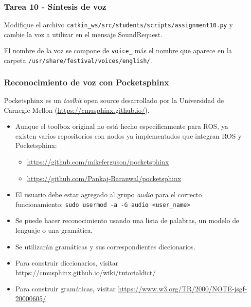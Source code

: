 \begin{frame}[containsverbatim]\frametitle{Tarea 10 - Síntesis de voz}
  Modifique el archivo \texttt{catkin\_ws/src/students/scripts/assignment10.py} y cambie la voz a utilizar en el mensaje SoundRequest.
  
  El nombre de la voz se compone de \texttt{voice\_} más el nombre que aparece en la carpeta \texttt{/usr/share/festival/voices/english/}. 
\end{frame}

\begin{frame}\frametitle{Reconocimiento de voz con Pocketsphinx}
  Pocketsphinx es un \textit{toolkit} open source desarrollado por la Universidad de Carnegie Mellon (\url{https://cmusphinx.github.io/}).
  \begin{itemize}
  \item Aunque el toolbox original no está hecho específicamente para ROS, ya existen varios repositorios con nodos ya implementados que integran ROS y Pocketsphinx:
    \begin{itemize}
    \item \url{https://github.com/mikeferguson/pocketsphinx}
    \item \url{https://github.com/Pankaj-Baranwal/pocketsphinx}
    \end{itemize}
  \item El usuario debe estar agregado al grupo \textit{audio} para el correcto funcionamiento: \texttt{sudo usermod -a -G audio <user\_name>}
  \end{itemize}
  \begin{itemize}
  \item Se puede hacer reconocimiento usando una lista de palabras, un modelo de lenguaje o una gramática.
  \item Se utilizarán gramáticas y sus correspondientes diccionarios.
  \item Para construir diccionarios, visitar \url{https://cmusphinx.github.io/wiki/tutorialdict/}
  \item Para construir gramáticas, visitar \url{https://www.w3.org/TR/2000/NOTE-jsgf-20000605/}
  \end{itemize}
\end{frame}

